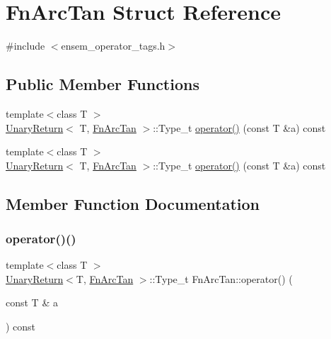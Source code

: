 \hypertarget{structFnArcTan}{}\section{Fn\+Arc\+Tan Struct Reference}
\label{structFnArcTan}


{\ttfamily \#include $<$ensem\+\_\+operator\+\_\+tags.\+h$>$}

\subsection*{Public Member Functions}
\begin{DoxyCompactItemize}
\item 
{\footnotesize template$<$class T $>$ }\\\mbox{\hyperlink{structUnaryReturn}{Unary\+Return}}$<$ T, \mbox{\hyperlink{structFnArcTan}{Fn\+Arc\+Tan}} $>$\+::Type\+\_\+t \mbox{\hyperlink{structFnArcTan_a7e6a58ff73a64fb87d8a8a232050a225}{operator()}} (const T \&a) const
\item 
{\footnotesize template$<$class T $>$ }\\\mbox{\hyperlink{structUnaryReturn}{Unary\+Return}}$<$ T, \mbox{\hyperlink{structFnArcTan}{Fn\+Arc\+Tan}} $>$\+::Type\+\_\+t \mbox{\hyperlink{structFnArcTan_a7e6a58ff73a64fb87d8a8a232050a225}{operator()}} (const T \&a) const
\end{DoxyCompactItemize}


\subsection{Member Function Documentation}
\mbox{\label{structFnArcTan_a7e6a58ff73a64fb87d8a8a232050a225}} 
\subsubsection{\texorpdfstring{operator()()}{operator()()}\hspace{0.1cm}{\footnotesize\ttfamily [1/2]}}
{\footnotesize\ttfamily template$<$class T $>$ \\
\mbox{\hyperlink{structUnaryReturn}{Unary\+Return}}$<$T, \mbox{\hyperlink{structFnArcTan}{Fn\+Arc\+Tan}} $>$\+::Type\+\_\+t Fn\+Arc\+Tan\+::operator() (\begin{DoxyParamCaption}\item[{const T \&}]{a }\end{DoxyParamCaption}) const\hspace{0.3cm}{\ttfamily [inline]}}

